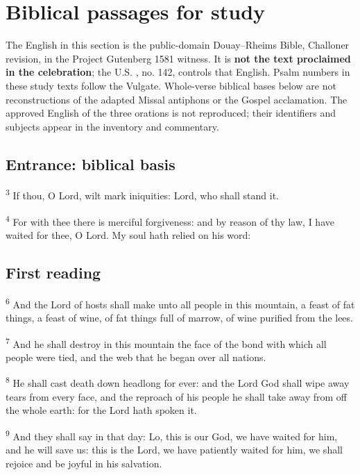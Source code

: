\section{Biblical passages for study}
The English in this section is the public-domain Douay--Rheims Bible, Challoner revision, in the Project Gutenberg 1581 witness. It is \textbf{not the text proclaimed in the celebration}; the U.S. , no. 142, controls that English. Psalm numbers in these study texts follow the Vulgate. Whole-verse biblical bases below are not reconstructions of the adapted Missal antiphons or the Gospel acclamation. The approved English of the three orations is not reproduced; their identifiers and subjects appear in the inventory and commentary.

\subsection{Entrance: biblical basis}
\label{proper-entrance}



\textsuperscript{3} If thou, O Lord, wilt mark iniquities: Lord, who shall stand it.

\textsuperscript{4} For with thee there is merciful forgiveness: and by reason of thy law, I have waited for thee, O Lord. My soul hath relied on his word:

\subsection{First reading}
\label{proper-first-reading}

\textsuperscript{6} And the Lord of hosts shall make unto all people in this mountain, a feast of fat things, a feast of wine, of fat things full of marrow, of wine purified from the lees.

\textsuperscript{7} And he shall destroy in this mountain the face of the bond with which all people were tied, and the web that he began over all nations.

\textsuperscript{8} He shall cast death down headlong for ever: and the Lord God shall wipe away tears from every face, and the reproach of his people he shall take away from off the whole earth: for the Lord hath spoken it.

\textsuperscript{9} And they shall say in that day: Lo, this is our God, we have waited for him, and he will save us: this is the Lord, we have patiently waited for him, we shall rejoice and be joyful in his salvation.

